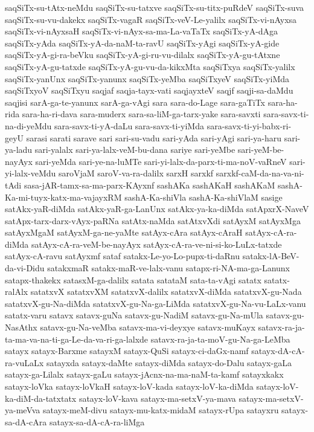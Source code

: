 {saqSiTx-su-tAtx-neMdu
saqSiTx-su-tatxve
saqSiTx-su-titx-puRdeV
saqSiTx-suva
saqSiTx-su-vu-dakekx
saqSiTx-vagaR
saqSiTx-veV-Le-yalilx
saqSiTx-vi-nAyxsa
saqSiTx-vi-nAyxsaH
saqSiTx-vi-nAyx-sa-ma-La-vaTaTx
saqSiTx-yA-dAga
saqSiTx-yAda
saqSiTx-yA-da-naM-ta-ravU
saqSiTx-yAgi
saqSiTx-yA-gide
saqSiTx-yA-gi-ra-beVku
saqSiTx-yA-gi-ru-vu-dilalx
saqSiTx-yA-gu-tAtxne
saqSiTx-yA-gu-tatxde
saqSiTx-yA-gu-vu-da-kikxMta
saqSiTxya
saqSiTx-yalilx
saqSiTx-yanUnx
saqSiTx-yanunx
saqSiTx-yeMba
saqSiTxyeV
saqSiTx-yiMda
saqSiTxyoV
saqSiTxyu
saqjaf
saqja-tayx-vati
saqjayxteV
saqjf
saqji-sa-daMdu
saqjisi
sarA-ga-te-yanunx
sarA-ga-vAgi
sara
sara-do-Lage
sara-gaTiTx
sara-ha-rida
sara-ha-ri-dava
sara-muderx
sara-sa-liM-ga-tarx-yake
sara-savxti
sara-savx-ti-na-di-yeMdu
sara-savx-ti-yA-daLu
sara-savx-ti-yiMda
sara-savx-ti-yi-babx-ri-geyU
sarasi
sarati
sarave
sari
sari-su-vadu
sari-yAda
sari-yAgi
sari-ya-haru
sari-ya-ladu
sari-yalalx
sari-ya-lalx-veM-bu-dana
sariye
sari-yeMbe
sari-yeM-be-nayAyx
sari-yeMda
sari-ye-na-luMTe
sari-yi-lalx-da-parx-ti-ma-noV-vaRneV
sari-yi-lalx-veMdu
saroVjaM
saroV-va-ra-dalilx
sarxH
sarxkf
sarxkf-caM-da-na-va-ni-tAdi
sasa-jAR-tamx-sa-ma-parx-KAyxnf
sashAKa
sashAKaH
sashAKaM
sashA-Ka-mi-tuyx-katx-ma-vajayxRM
sashA-Ka-shiVla
sashA-Ka-shiVlaM
sasige
satAkx-yaR-diMda
satAkx-yaR-ga-LanUnx
satAkx-ya-ka-diMda
satApxrX-NaveV
satApx-tarx-darx-vAyx-paRNa
satAtx-naMda
satAtxvXdi
satAyxM
satAyxMga
satAyxMgaM
satAyxM-ga-ne-yaMte
satAyx-cAra
satAyx-cAraH
satAyx-cA-ra-diMda
satAyx-cA-ra-veM-be-nayAyx
satAyx-cA-ra-ve-ni-si-ko-LuLx-tatxde
satAyx-cA-ravu
satAyxmf
sataf
satakx-Le-yo-Lo-pupx-ti-daRnu
satakx-lA-BeV-da-vi-Didu
satakxmaR
satakx-maR-ve-lalx-vanu
satapx-ri-NA-ma-ga-Lanunx
satapx-thakekx
satasxM-ga-dalilx
satata
satataM
sata-ta-vAgi
satatx
satatx-ralAlx
satatxvX
satatxvXM
satatxvX-dalilx
satatxvX-diMda
satatxvX-gu-Nada
satatxvX-gu-Na-diMda
satatxvX-gu-Na-ga-LiMda
satatxvX-gu-Na-vu-LaLx-vanu
satatx-varu
satavx
satavx-guNa
satavx-gu-NadiM
satavx-gu-Na-mUla
satavx-gu-NasAthx
satavx-gu-Na-veMba
satavx-ma-vi-deyxye
satavx-muKayx
satavx-ra-ja-ta-ma-va-na-ti-ga-Le-da-va-ri-ga-lalxde
satavx-ra-ja-ta-moV-gu-Na-ga-LeMba
satayx
satayx-Barxme
satayxM
satayx-QuSi
satayx-ci-daGx-namf
satayx-dA-cA-ra-vuLaLx
satayxda
satayx-daMte
satayx-diMda
satayx-do-Dalu
satayx-gaLa
satayx-ga-Lilalx
satayx-gaLu
satayx-jAcnx-na-ma-naM-ta-kamf
satayxkakx
satayx-loVka
satayx-loVkaH
satayx-loV-kada
satayx-loV-ka-diMda
satayx-loV-ka-diM-da-tatxtatx
satayx-loV-kava
satayx-ma-setxV-ya-mava
satayx-ma-setxV-ya-meVva
satayx-meM-divu
satayx-mu-katx-midaM
satayx-rUpa
satayxru
satayx-sa-dA-cAra
satayx-sa-dA-cA-ra-liMga
}

